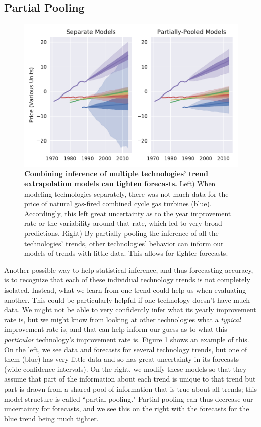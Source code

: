 \documentclass{article}
\begin{document}
\subsection{Partial Pooling}\label{partial_pooling_section}
\begin{figure}
    \centering
    \includegraphics[width=.75\textwidth]{figs/Separate_vs_Pooled_Extrapolation_Demonstration_Price.pdf}
    \caption{\textbf{Combining inference of multiple technologies' trend extrapolation models can tighten forecasts.} Left) When modeling technologies separately, there was not much data for the price of natural gas-fired combined cycle gas turbines (blue). Accordingly, this left great uncertainty as to the year improvement rate or the variability around that rate, which led to very broad predictions. Right) By partially pooling the inference of all the technologies' trends, other technologies' behavior can inform our models of trends with little data. This allows for tighter forecasts.}
    \label{fig:Separate_vs_Pooled_Extrapolation_Demonstration}
\end{figure}

Another possible way to help statistical inference, and thus forecasting accuracy, is to recognize that each of these individual technology trends is not completely isolated. Instead, what we learn from one trend could help us when evaluating another. This could be particularly helpful if one technology doesn't have much data. We might not be able to very confidently infer what its yearly improvement rate is, but we might know from looking at other technologies what a \textit{typical} improvement rate is, and that can help inform our guess as to what this \textit{particular} technology's improvement rate is. Figure \ref{fig:Separate_vs_Pooled_Extrapolation_Demonstration} shows an example of this. On the left, we see data and forecasts for several technology trends, but one of them (blue) has very little data and so has great uncertainty in its forecasts (wide confidence intervals). On the right, we modify these models so that they assume that part of the information about each trend is unique to that trend but part is drawn from a shared pool of information that is true about all trends; this model structure is called ``partial pooling." Partial pooling can thus decrease our uncertainty for forecasts, and we see this on the right with the forecasts for the blue trend being much tighter.
\end{document}
